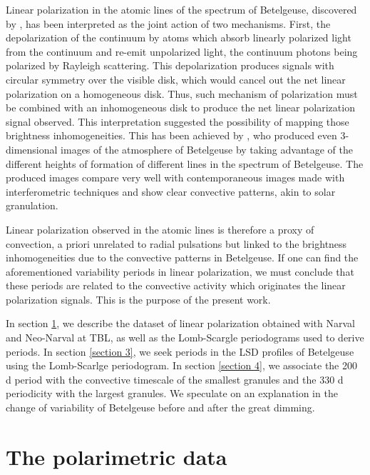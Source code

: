 \documentclass{aa}
\begin{document}
Linear polarization in the atomic lines of the spectrum of Betelgeuse, discovered by \cite{auriere_discovery_2016}, has been interpreted as the joint action of 
two mechanisms. First, the depolarization of the continuum by atoms which absorb linearly polarized light from the continuum and re-emit unpolarized light,
the continuum photons being polarized by Rayleigh scattering. This depolarization produces signals with circular symmetry over the visible disk, which would  cancel out the net linear polarization on a homogeneous disk. Thus, such mechanism of polarization must be combined with an inhomogeneous disk to produce the net linear polarization 
signal observed. This interpretation suggested the possibility of mapping those brightness inhomogeneities. This has been achieved by \cite{lopez_ariste_convective_2018}, who produced even 3-dimensional images of the atmosphere of Betelgeuse \citep{lopez_ariste_three-dimensional_2022} by taking advantage of the different heights of formation of 
different lines in the spectrum of Betelgeuse. The produced images compare very well with contemporaneous images made with interferometric 
techniques \citep{montarges_close_2016} and show clear convective patterns, akin to solar granulation.\

Linear polarization observed in the atomic lines is therefore a proxy of convection, a priori unrelated to radial 
pulsations but linked to the brightness inhomogeneities due to the convective patterns in Betelgeuse. If one can find the aforementioned variability periods 
in linear polarization, we must conclude that these periods are related to the convective activity which originates the linear polarization signals.
This is the purpose of the present work.\

In section \ref{Section 2}, we describe the dataset of linear polarization obtained with Narval and Neo-Narval at TBL, as well as the Lomb-Scargle periodograms used to derive periods. In section \ref{section 3}, we seek periods in the LSD profiles of Betelgeuse using the Lomb-Scarlge periodogram. In section \ref{section 4}, we associate the 200 d period with the convective timescale of the smallest granules and the 330 d periodicity with the largest granules. We speculate on an explanation in the change of variability of Betelgeuse before and after the great dimming. 


\section{The polarimetric data}
\label{Section 2}
\end{document}
